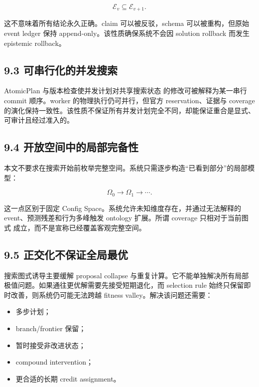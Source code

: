 \documentclass[
  11pt]{ctexart}
\providecommand{\tightlist}{%
  \setlength{\itemsep}{0pt}\setlength{\parskip}{0pt}}
\begin{document}
\[
\mathcal{E}_{v}\subseteq\mathcal{E}_{v+1}.
\]

这不意味着所有结论永久正确。claim 可以被反驳，schema 可以被重构，但原始
event ledger 保持 append-only。该性质确保系统不会因 solution rollback
而发生 epistemic rollback。

\subsection{9.3
可串行化的并发搜索}\label{ux53efux4e32ux884cux5316ux7684ux5e76ux53d1ux641cux7d22}

AtomicPlan 与版本检查使并发计划对共享搜索状态 的修改可被解释为某一串行
commit 顺序。worker 的物理执行仍可并行，但官方 reservation、证据与
coverage
的演化保持一致性。该性质不保证所有并发计划完全不同，却能保证重合是显式、可审计且经过准入的。

\subsection{9.4
开放空间中的局部完备性}\label{ux5f00ux653eux7a7aux95f4ux4e2dux7684ux5c40ux90e8ux5b8cux5907ux6027}

本文不要求在搜索开始前枚举完整空间。系统只需逐步构造``已看到部分''的局部模型：

\[
\Omega_0 \rightarrow \Omega_1 \rightarrow \cdots.
\]

这一点区别于固定 Config Space。系统允许未知维度存在，并通过无法解释的
event、预测残差和行为多峰触发 ontology 扩展。所谓 coverage
只相对于当前图式 成立，而不是宣称已经覆盖客观完整空间。

\subsection{9.5
正交化不保证全局最优}\label{ux6b63ux4ea4ux5316ux4e0dux4fddux8bc1ux5168ux5c40ux6700ux4f18}

搜索图式诱导主要缓解 proposal collapse
与重复计算。它不能单独解决所有局部极值问题。如果通往更优解需要先接受短期退化，而
selection rule 始终只保留即时改善，则系统仍可能无法跨越 fitness
valley。解决该问题还需要：

\begin{itemize}
\tightlist
\item
  多步计划；
\item
  branch/frontier 保留；
\item
  暂时接受非改进状态；
\item
  compound intervention；
\item
  更合适的长期 credit assignment。
\end{itemize}
\end{document}
